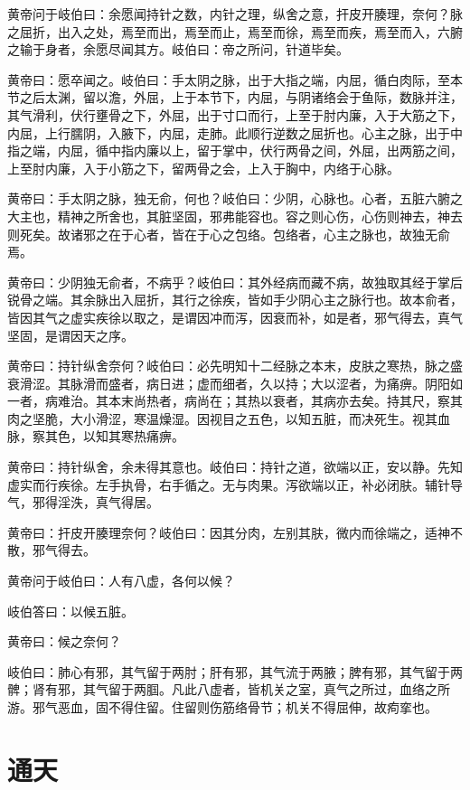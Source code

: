 \documentclass[12pt,UTF8]{ctexbook}
\begin{document}
	黄帝问于岐伯曰：余愿闻持针之数，内针之理，纵舍之意，扞皮开腠理，奈何？脉之屈折，出入之处，焉至而出，焉至而止，焉至而徐，焉至而疾，焉至而入，六腑之输于身者，余愿尽闻其方。岐伯曰：帝之所问，针道毕矣。
	
	黄帝曰：愿卒闻之。岐伯曰：手太阴之脉，出于大指之端，内屈，循白肉际，至本节之后太渊，留以澹，外屈，上于本节下，内屈，与阴诸络会于鱼际，数脉并注，其气滑利，伏行壅骨之下，外屈，出于寸口而行，上至于肘内廉，入于大筋之下，内屈，上行臑阴，入腋下，内屈，走肺。此顺行逆数之屈折也。心主之脉，出于中指之端，内屈，循中指内廉以上，留于掌中，伏行两骨之间，外屈，出两筋之间，上至肘内廉，入于小筋之下，留两骨之会，上入于胸中，内络于心脉。
	
	黄帝曰：手太阴之脉，独无俞，何也？岐伯曰：少阴，心脉也。心者，五脏六腑之大主也，精神之所舍也，其脏坚固，邪弗能容也。容之则心伤，心伤则神去，神去则死矣。故诸邪之在于心者，皆在于心之包络。包络者，心主之脉也，故独无俞焉。
	
	黄帝曰：少阴独无俞者，不病乎？岐伯曰：其外经病而藏不病，故独取其经于掌后锐骨之端。其余脉出入屈折，其行之徐疾，皆如手少阴心主之脉行也。故本俞者，皆因其气之虚实疾徐以取之，是谓因冲而泻，因衰而补，如是者，邪气得去，真气坚固，是谓因天之序。
	
	黄帝曰：持针纵舍奈何？岐伯曰：必先明知十二经脉之本末，皮肤之寒热，脉之盛衰滑涩。其脉滑而盛者，病日进；虚而细者，久以持；大以涩者，为痛痹。阴阳如一者，病难治。其本末尚热者，病尚在；其热以衰者，其病亦去矣。持其尺，察其肉之坚脆，大小滑涩，寒温燥湿。因视目之五色，以知五脏，而决死生。视其血脉，察其色，以知其寒热痛痹。
	
	黄帝曰：持针纵舍，余未得其意也。岐伯曰：持针之道，欲端以正，安以静。先知虚实而行疾徐。左手执骨，右手循之。无与肉果。泻欲端以正，补必闭肤。辅针导气，邪得淫泆，真气得居。
	
	黄帝曰：扞皮开腠理奈何？岐伯曰：因其分肉，左别其肤，微内而徐端之，适神不散，邪气得去。
	
	黄帝问于岐伯曰：人有八虚，各何以候？
	
	岐伯答曰：以候五脏。
	
	黄帝曰：候之奈何？
	
	岐伯曰：肺心有邪，其气留于两肘；肝有邪，其气流于两腋；脾有邪，其气留于两髀；肾有邪，其气留于两腘。凡此八虚者，皆机关之室，真气之所过，血络之所游。邪气恶血，固不得住留。住留则伤筋络骨节；机关不得屈伸，故痀挛也。
	
	\chapter{通天}
\end{document}
